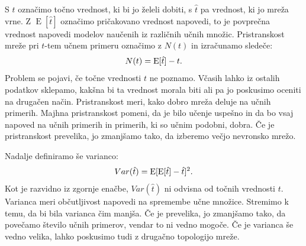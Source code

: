 \documentclass[mat1]{fmfdelo}
\begin{document}
S $t$ označimo točno vrednost, ki bi jo želeli dobiti, s $\hat{t}$ pa vrednost, ki jo mreža vrne. Z $\operatorname{E}[\hat{t}]$ označimo pričakovano vrednost napovedi, to je povprečna vrednost napovedi modelov naučenih iz različnih učnih množic. Pristranskost mreže pri $t$-tem učnem primeru označimo z $N(t)$ in izračunamo sledeče:
%
\begin{equation}
N(t) = \operatorname{E}[\hat{t}] - t \text.
\end{equation}
%
Problem se pojavi, če točne vrednosti $t$ ne poznamo. Včasih lahko iz ostalih podatkov sklepamo, kakšna bi ta vrednost morala biti ali pa jo poskusimo oceniti na drugačen način. Pristranskost meri, kako dobro mreža deluje na učnih primerih. Majhna pristranskost pomeni, da je bilo učenje uspešno in da bo vsaj napoved na učnih primerih in primerih, ki so učnim podobni, dobra. Če je pristranskost prevelika, jo zmanjšamo tako, da izberemo večjo nevronsko mrežo.

Nadalje definiramo še varianco:
%
\begin{equation}
Var(\hat{t}) = \operatorname{E}[\operatorname{E}[\hat{t}] -\hat{t}]^2\text.
\end{equation}
%
Kot je razvidno iz zgornje enačbe, $Var(\hat{t})$ ni odvisna od točnih vrednosti $t$. Varianca meri  občutljivost napovedi na spremembe učne množice. Stremimo k temu, da bi bila varianca čim manjša. Če je prevelika, jo zmanjšamo tako, da povečamo število učnih primerov, vendar to ni vedno mogoče. Če je varianca še vedno velika, lahko poskusimo tudi z drugačno topologijo mreže.
\end{document}
